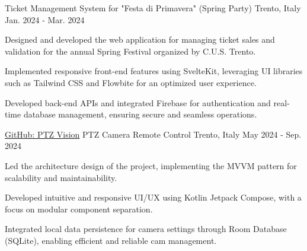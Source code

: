 
\begin{cventries}
  {Ticket Management System for "Festa di Primavera" (Spring Party)} %
  {Trento, Italy} %
  {Jan. 2024 - Mar. 2024} %
  { \begin{cvitems} %
  \item {Designed and developed the web application for managing ticket sales and validation for the annual Spring Festival organized by C.U.S. Trento.} \item {Implemented responsive front-end features using SvelteKit, leveraging UI libraries such as Tailwind CSS and Flowbite for an optimized user experience.} \item {Developed back-end APIs and integrated Firebase for authentication and real-time database management, ensuring secure and seamless operations.}\end{cvitems} }

  \cventry
  { \href{https://github.com/PTZ-Vision/PTZ-Vision-Android}{GitHub: PTZ Vision}} %
  {PTZ Camera Remote Control} %
  {Trento, Italy} %
  {May 2024 - Sep. 2024} %
  { \begin{cvitems}\item {Led the architecture design of the project, implementing the MVVM pattern for scalability and maintainability.} \item {Developed intuitive and responsive UI/UX using Kotlin Jetpack Compose, with a focus on modular component separation.} \item {Integrated local data persistence for camera settings through Room Database (SQLite), enabling efficient and reliable cam management.}\end{cvitems} }
\end{cventries}
